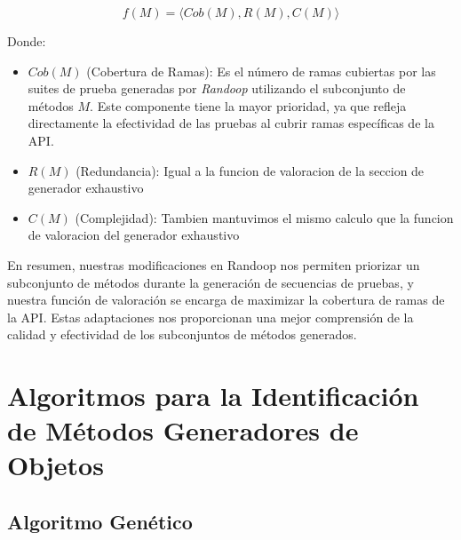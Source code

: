 \[
f(M) = \langle Cob(M), R(M), C(M) \rangle
\]

Donde:

\begin{itemize}
    \item $Cob(M)$ (Cobertura de Ramas): Es el número de ramas cubiertas por las suites de prueba generadas por \emph{Randoop} utilizando el subconjunto de métodos $M$. Este componente tiene la mayor prioridad, ya que refleja directamente la efectividad de las pruebas al cubrir ramas específicas de la API.
    \item $R(M)$ (Redundancia): Igual a la funcion de valoracion de la seccion de generador exhaustivo
    \item $C(M)$ (Complejidad): Tambien mantuvimos el mismo calculo que la funcion de valoracion del generador exhaustivo
\end{itemize}

En resumen, nuestras modificaciones en Randoop nos permiten priorizar un subconjunto de métodos durante la generación de secuencias de pruebas, y nuestra función de valoración se encarga de maximizar la cobertura de ramas de la API. Estas adaptaciones nos proporcionan una mejor comprensión de la calidad y efectividad de los subconjuntos de métodos generados.


\section{Algoritmos para la Identificación de Métodos Generadores de Objetos}
\label{sec:algorithms}


\subsection{Algoritmo Genético}
\label{alg:approachGA}

